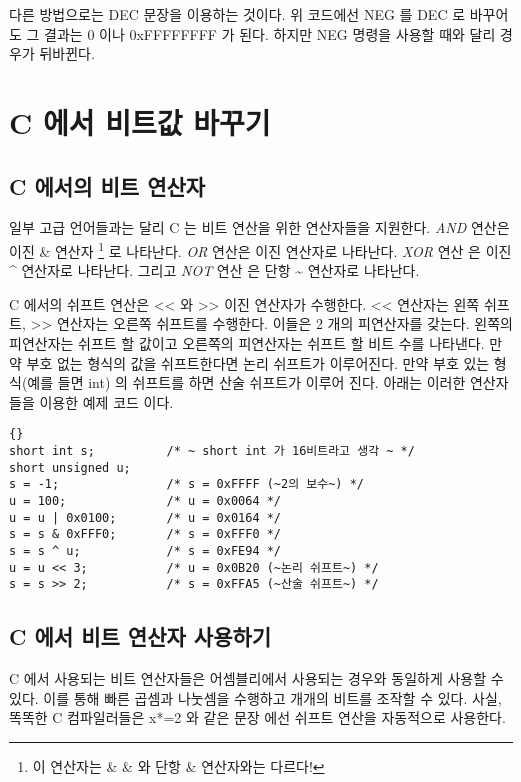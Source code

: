 다른 방법으로는 {\code DEC} 문장을 이용하는 것이다. 위 코드에선 
{\code NEG} 를 {\code DEC} 로 바꾸어도 그 결과는 0 이나 0xFFFFFFFF 가 된다.
하지만 {\code NEG} 명령을 사용할 때와 달리 경우가 뒤바뀐다. 

\section{C 에서 비트값 바꾸기}

\subsection{C 에서의 비트 연산자}

일부 고급 언어들과는 달리 C 는 비트 연산을 위한 연산자들을 지원한다. 
\emph{AND} 연산은 이진 {\code \&} 연산자 \footnote{이 연산자는
{\code \&{} \&} 와 단항 {\code \&} 연산자와는 다르다!} 로 나타난다.
\emph{OR} 연산은 이진 {\code \textbar} 연산자로 나타난다. \emph{XOR} 연산
은 이진 {\code \textasciicircum} 연산자로 나타난다. 그리고 \emph{NOT} 연산
은 단항 {\code \textasciitilde} 연산자로 나타난다.

C 에서의 쉬프트 연산은 {\code <<} 와 {\code >>} 이진 연산자가
수행한다. {\code <<} 연산자는 왼쪽 쉬프트, {\code >>} 연산자는
오른쪽 쉬프트를 수행한다. 이들은 2 개의 피연산자를 갖는다. 왼쪽의 피연산자는
쉬프트 할 값이고 오른쪽의 피연산자는 쉬프트 할 비트 수를 나타낸다. 만약
부호 없는 형식의 값을 쉬프트한다면 논리 쉬프트가 이루어진다. 만약 부호
있는 형식(예를 들면 {\code int}) 의 쉬프트를 하면 산술 쉬프트가 이루어
진다. 아래는 이러한 연산자들을 이용한 예제 코드 이다. 

\begin{lstlisting}[escapeinside=~~]{}
short int s;          /* ~ short int 가 16비트라고 생각 ~ */
short unsigned u;
s = -1;               /* s = 0xFFFF (~2의 보수~) */
u = 100;              /* u = 0x0064 */
u = u | 0x0100;       /* u = 0x0164 */
s = s & 0xFFF0;       /* s = 0xFFF0 */
s = s ^ u;            /* s = 0xFE94 */
u = u << 3;           /* u = 0x0B20 (~논리 쉬프트~) */
s = s >> 2;           /* s = 0xFFA5 (~산술 쉬프트~) */
\end{lstlisting}

\subsection{C 에서 비트 연산자 사용하기}

C 에서 사용되는 비트 연산자들은 어셈블리에서 사용되는 경우와 동일하게
사용할 수 있다. 이를 통해 빠른 곱셈과 나눗셈을 수행하고 개개의 비트를 
조작할 수 있다. 사실, 똑똑한 C 컴파일러들은 {\code x*=2} 와 같은 문장
에선 쉬프트 연산을 자동적으로 사용한다. 

